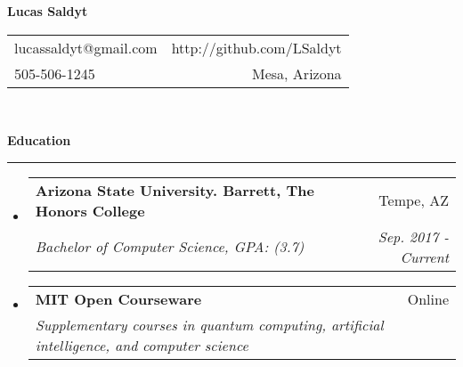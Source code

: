 \documentclass[letterpaper,11pt]{article}
\makeatletter
\newcommand{\sectionline}{
    \noindent\rule[0.5ex]{\linewidth}{0.5pt}
}
\newcommand{\resitem}[1]{\item #1 \vspace{-3pt}}
\newcommand{\resheading}[1]{
    {\large \textbf{#1}}
    \sectionline
}
\newcommand{\colfill}{@{\extracolsep{\fill}}}
\newcommand{\ressubheading}[4]{
\begin{tabular*}{6.5in}{l\colfill r}
		\textbf{#1} & #2 \\
		\textit{#3} & \textit{#4} \\
\end{tabular*}\vspace{-6pt}}
\makeatother
\begin{document}
\begin{center}
\textbf{\Large Lucas Saldyt}
\end{center}
\begin{tabular*}{7in}{l \colfill r}
lucassaldyt@gmail.com & http://github.com/LSaldyt\\
505-506-1245 & Mesa, Arizona \\
\end{tabular*}
\\

\vspace{0.1in}

\resheading{Education}
\begin{itemize}
\item
    \ressubheading{Arizona State University. Barrett, The Honors College}{Tempe, AZ}{Bachelor of Computer Science, GPA: (3.7)}{Sep. 2017 - Current}
\item
    \ressubheading{MIT Open Courseware}{Online}{Supplementary courses in quantum computing, artificial intelligence, and computer science}{}

\end{itemize}
\end{document}
